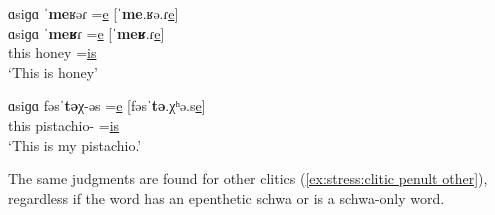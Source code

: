 \begin{exe}
	\ex \label{ex:stress:clitic penult} 
	\begin{xlist}
		\ex \glll ɑsiɡɑ ˈ\textbf{me}ʁəɾ =\underline{e} [ˈ\textbf{me}.ʁə.ɾ\underline{e}]   \\
		ɑsiɡɑ ˈ\textbf{meʁ}ɾ =\underline{e} [ˈ\textbf{meʁ}.ɾ\underline{e}]  \\
		this honey =\underline{is} 
		\\
		\trans `This is honey' 
		\\
		
		\ex \gll ɑsiɡɑ fəsˈ\textbf{tə}χ-əs =\underline{e} [fəsˈ\textbf{tə}.χʰə.s\underline{e}]  \\
		this pistachio-{\possFsg} =\underline{is} ~ 
		\\
		\trans `This is my pistachio.' 
		\\
		
	\end{xlist}
	
\end{exe}

The same judgments are found for other clitics (\ref{ex:stress:clitic penult other}), regardless if the word has an epenthetic schwa or is a schwa-only word. 

